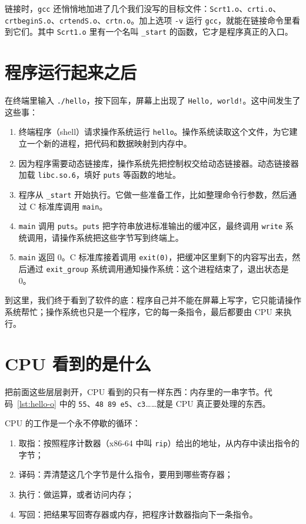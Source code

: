 链接时，\texttt{gcc} 还悄悄地加进了几个我们没写的目标文件：\texttt{Scrt1.o}、\texttt{crti.o}、\texttt{crtbeginS.o}、\texttt{crtendS.o}、\texttt{crtn.o}。加上选项 \texttt{-v} 运行 \texttt{gcc}，就能在链接命令里看到它们。其中 \texttt{Scrt1.o} 里有一个名叫 \texttt{\_start} 的函数，它才是程序真正的入口。

\section{程序运行起来之后}
\label{sec:runtime}

在终端里输入 \texttt{./hello}，按下回车，屏幕上出现了 \texttt{Hello, world!}。这中间发生了这些事：
\begin{enumerate}
  \item 终端程序（shell）请求操作系统运行 \texttt{hello}。操作系统读取这个文件，为它建立一个新的进程，把代码和数据映射到内存中。
  \item 因为程序需要动态链接库，操作系统先把控制权交给动态链接器。动态链接器加载 \texttt{libc.so.6}，填好 \texttt{puts} 等函数的地址。
  \item 程序从 \texttt{\_start} 开始执行。它做一些准备工作，比如整理命令行参数，然后通过 C 标准库调用 \texttt{main}。
  \item \texttt{main} 调用 \texttt{puts}。\texttt{puts} 把字符串放进标准输出的缓冲区，最终调用 \texttt{write} 系统调用，请操作系统把这些字节写到终端上。
  \item \texttt{main} 返回 0。C 标准库接着调用 \texttt{exit(0)}，把缓冲区里剩下的内容写出去，然后通过 \texttt{exit\_group} 系统调用通知操作系统：这个进程结束了，退出状态是 0。
\end{enumerate}

到这里，我们终于看到了软件的底：程序自己并不能在屏幕上写字，它只能请操作系统帮忙；操作系统也只是一个程序，它的每一条指令，最后都要由 CPU 来执行。

\section{CPU 看到的是什么}

把前面这些层层剥开，CPU 看到的只有一样东西：内存里的一串字节。代码~\ref{lst:hello-o} 中的 \texttt{55}、\texttt{48 89 e5}、\texttt{c3}……就是 CPU 真正要处理的东西。

CPU 的工作是一个永不停歇的循环：
\begin{enumerate}
  \item {}取指：按照程序计数器（x86-64 中叫 \texttt{rip}）给出的地址，从内存中读出指令的字节；
  \item 译码：弄清楚这几个字节是什么指令，要用到哪些寄存器；
  \item 执行：做运算，或者访问内存；
  \item 写回：把结果写回寄存器或内存，把程序计数器指向下一条指令。
\end{enumerate}

